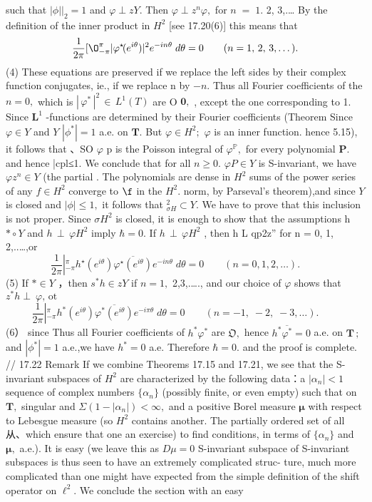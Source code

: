 such that $|\phi||_{2}=1$ and $\varphi\perp z Y.$ Then $\varphi\perp z^{n}\varphi,$ for $\scriptstyle n\;=\;1.$ 2, 3,.… By the definition of the inner product in $H^{2}$ [see 17.20(6)] this means that $$ \frac{1}{2\pi} [\O_{-\pi}^{\pi}|\varphi^{\star}\!(e^{i\theta})|^{2}e^{-i n\theta}\;d\theta=0\qquad(n=1,\,2,\,3,\dots). $$ (4) These equations are preserved if we replace the left sides by their complex function conjugates, ie., if we replace n by $-n.$ Thus all Fourier coefficients of the $n=0,$ which is $|\,\varphi^{\ast}\,|^{2}\,\in\,L^{1}(T)$ are O ${\boldsymbol{0}},$ , except the one corresponding to 1. Since ${\boldsymbol{L}}^{1}$ -functions are determined by their Fourier coefficients (Theorem Since $\varphi\in Y$ and ${\mathbf{}}Y$ $\textstyle|\phi^{*}|=1$ a.e. on ${\boldsymbol{T}}.$ But $\varphi\in H^{2};$ $\varphi$ is an inner function. hence 5.15), it follows that 、SO $\varphi$ p is the Poisson integral of $\varphi^{\mathbb{P}},$ for every polynomial ${\boldsymbol{P}}.$ and hence |cpl≤1. We conclude that for all $\scriptstyle n\geq0.$ $\varphi P\in Y$ is S-invariant, we have $\varphi z^{n}\in Y$ (the partial . The polynomials are dense in $H^{2}$ sums of the power series of any $\textstyle f\in H^{2}$ converge to $\boldsymbol{\f}$ in the $H^{2}.$ norm, by Parseval's theorem),and since ${\mathbf{}}Y$ is closed and $|\phi|\leq1,$ it follows that $_{\sigma H}^{2}\subset Y.$ We have to prove that this inclusion is not proper. Since $\sigma H^{2}$ is closed, it is enough to show that the assumptions h $*\circ Y$ and $h\,\perp\,\varphi H^{2}$ imply $\hbar=0.$ If $h\,\perp\,\varphi H^{2}$ , then h L qp2z” for n = 0, 1, 2,..…,or $$ \frac{1}{2\pi}\left|_{-\pi}^{\pi}h^{\star}(e^{i\theta})\overline{{{\varphi^{\star}(e^{i\theta})}}}e^{-i n\theta}\;d\theta=0\qquad(n=0,1,2,\ldots).\qquad\right. $$ (5) If $*\in Y$ ，then $s^{*}h\in z Y$ if $n=1,$ 2,3,.…., and our choice of $\varphi$ shows that $z^{*}h\perp\ \varphi,\,\mathrm{ot}$ $$ \frac{1}{2\pi}\left|_{-\pi}^{\pi}h^{*}(e^{i\theta})\overline{{{\varphi^{*}(e^{i\theta})}}}e^{-i\pi\theta}\;d\theta=0\qquad(n=-1,\;-2,\;-3,\ldots).\qquad\right. $$ (6） since Thus all Fourier coefficients of $h^{\ast}\varphi^{\ast}$ are ${\mathfrak{O}},$ hence $h^{*}{\overline{{\varphi^{*}}}}=0$ a.e. on ${\boldsymbol{T}}\,;$ and $|\phi^{*}|=1$ a.e.,we have $h^{*}=0$ a.e. Therefore $\hbar=0.$ and the proof is complete. // 17.22 Remark If we combine Theorems 17.15 and 17.21, we see that the S-invariant subspaces of $H^{2}$ are characterized by the following data：a $|\alpha_{n}|<1$ sequence of complex numbers $\{\alpha_{n}\}$ (possibly finite, or even empty) such that on ${\boldsymbol{T}},$ singular and $\Sigma(1-|\alpha_{n}|)<\infty,$ and a positive Borel measure ${\boldsymbol{\mu}}$ with respect to Lebesgue measure (so $H^{2}$ contains another. The partially ordered set of all 从、which ensure that one an exercise) to find conditions, in terms of $\{\alpha_{n}\}$ and ${\boldsymbol{\mu}},$ a.e.). It is easy (we leave this as $D\mu=0$ S-invariant subspace of S-invariant subspaces is thus seen to have an extremely complicated struc- ture, much more complicated than one might have expected from the simple definition of the shift operator on $\ell^{2}.$ We conclude the section with an easy 